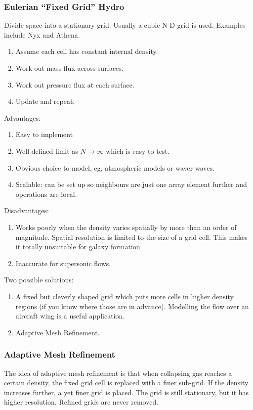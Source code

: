 \documentclass[12pt]{article}
\begin{document}
\subsubsection{Eulerian ``Fixed Grid'' Hydro}

Divide space into a stationary grid. Usually a cubic N-D grid is used. Examples include Nyx and Athena.
\begin{enumerate}
 \item Assume each cell has constant internal density.
 \item Work out mass flux across surfaces.
 \item Work out pressure flux at each surface.
 \item Update and repeat.
\end{enumerate}
Advantages:
\begin{enumerate}
\item Easy to implement
\item Well defined limit as $N \to \infty$ which is easy to test.
\item Obvious choice to model, eg, atmospheric models or waver waves.
\item Scalable: can be set up so neighbours are just one array element further and operations are local.
 \end{enumerate}
Disadvantages:
\begin{enumerate}
\item Works poorly when the density varies spatially by more than an order of magnitude. Spatial resolution is limited to the size of a grid cell. This makes it totally unsuitable for galaxy formation.
\item Inaccurate for supersonic flows.
\end{enumerate}

Two possible solutions:
\begin{enumerate}
\item A fixed but cleverly shaped grid which puts more cells in higher density regions (if you know where those are in advance). Modelling the flow over an aircraft wing is a useful application.
\item Adaptive Mesh Refinement.
\end{enumerate}

\subsubsection{Adaptive Mesh Refinement}

The idea of adaptive mesh refinement is that when collapsing gas reaches a certain density, the fixed grid cell is replaced with a finer sub-grid. If the density increases further, a yet finer grid is placed. The grid is still stationary, but it has higher resolution. Refined grids are never removed.
\end{document}

